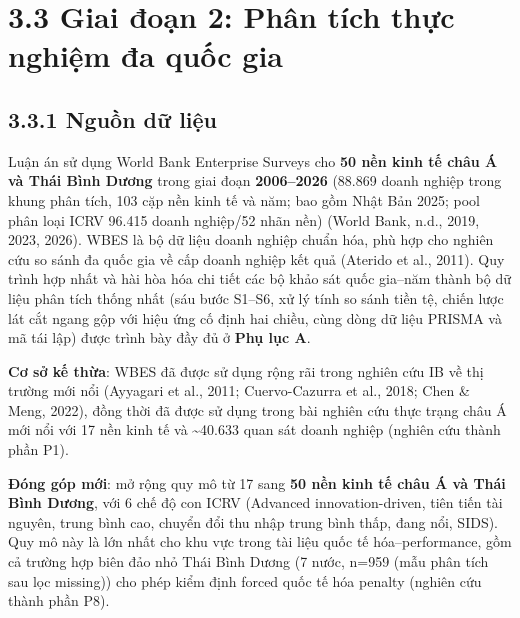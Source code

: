 \documentclass[
  a4paper,
  13pt]{extreport}
\begin{document}
\hypertarget{giai-ux111oux1ea1n-2-phuxe2n-tuxedch-thux1ef1c-nghiux1ec7m-ux111a-quux1ed1c-gia}{%
\section{3.3 Giai đoạn 2: Phân tích thực nghiệm đa quốc
gia}\label{giai-ux111oux1ea1n-2-phuxe2n-tuxedch-thux1ef1c-nghiux1ec7m-ux111a-quux1ed1c-gia}}

\hypertarget{nguux1ed3n-dux1eef-liux1ec7u}{%
\subsection{3.3.1 Nguồn dữ liệu}\label{nguux1ed3n-dux1eef-liux1ec7u}}

Luận án sử dụng World Bank Enterprise Surveys cho \textbf{50 nền kinh tế
châu Á và Thái Bình Dương} trong giai đoạn \textbf{2006--2026} (88.869
doanh nghiệp trong khung phân tích, 103 cặp nền kinh tế và năm; bao gồm
Nhật Bản 2025; pool phân loại ICRV 96.415 doanh nghiệp/52 nhãn nền)
(World Bank, n.d., 2019, 2023, 2026). WBES là bộ dữ liệu doanh nghiệp
chuẩn hóa, phù hợp cho nghiên cứu so sánh đa quốc gia về cấp doanh
nghiệp kết quả (Aterido et al., 2011). Quy trình hợp nhất và hài hòa hóa
chi tiết các bộ khảo sát quốc gia--năm thành bộ dữ liệu phân tích thống
nhất (sáu bước S1--S6, xử lý tính so sánh tiền tệ, chiến lược lát cắt
ngang gộp với hiệu ứng cố định hai chiều, cùng dòng dữ liệu PRISMA và mã
tái lập) được trình bày đầy đủ ở \textbf{Phụ lục A}.

\textbf{Cơ sở kế thừa}: WBES đã được sử dụng rộng rãi trong nghiên cứu
IB về thị trường mới nổi (Ayyagari et al., 2011; Cuervo-Cazurra et al.,
2018; Chen \& Meng, 2022), đồng thời đã được sử dụng trong bài nghiên
cứu thực trạng châu Á mới nổi với 17 nền kinh tế và
\textasciitilde40.633 quan sát doanh nghiệp (nghiên cứu thành phần P1).

\textbf{Đóng góp mới}: mở rộng quy mô từ 17 sang \textbf{50 nền kinh tế
châu Á và Thái Bình Dương}, với 6 chế độ con ICRV (Advanced
innovation-driven, tiên tiến tài nguyên, trung bình cao, chuyển đổi thu
nhập trung bình thấp, đang nổi, SIDS). Quy mô này là lớn nhất cho khu
vực trong tài liệu quốc tế hóa--performance, gồm cả trường hợp biên đảo
nhỏ Thái Bình Dương (7 nước, n=959 (mẫu phân tích sau lọc missing)) cho
phép kiểm định forced quốc tế hóa penalty (nghiên cứu thành phần P8).
\end{document}
